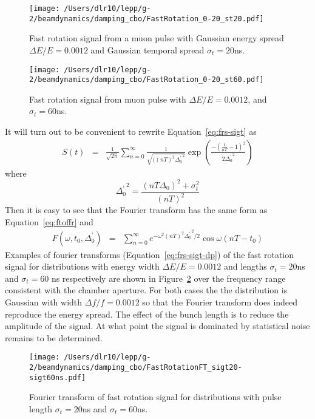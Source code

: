 \documentclass[10pt]{report}
\begin{document}
\begin{figure}[htbp] %
\begin{minipage}[t]{0.48\textwidth}
   \centering
   \texttt{[image: /Users/dlr10/lepp/g-2/beamdynamics/damping\_cbo/FastRotation\_0-20\_st20.pdf]} 
   \caption{Fast rotation signal from a muon pulse with Gaussian energy spread $\Delta E/E=0.0012$ and 
Gaussian temporal spread $\sigma_t = 20$ns. \label{fig:fastrotation_sigt20ns}}
 \end{minipage}
\hfill
\begin{minipage}[t]{0.48\textwidth}
\centering
   \texttt{[image: /Users/dlr10/lepp/g-2/beamdynamics/damping\_cbo/FastRotation\_0-20\_st60.pdf]} 
\caption{Fast rotation signal from muon pulse with $\Delta E/E = 0.0012$, and $\sigma_t = 60$ns.
   \label{fig:fastrotation_sigt60ns}}
\end{minipage}
\end{figure}
It will turn out to be convenient to rewrite Equation~\ref{eq:frs-sigt} as
\begin{eqnarray}
S(t)&=& \frac{1}{\sqrt{2\pi}}\sum_{n=0}^\infty
\frac{1}{\sqrt{((nT)^2{\Delta^\prime_0}^2}}
\exp(\frac{-(\frac{t}{nT}-1)^2}{2{\Delta^\prime_0}^2})\label{eq:frs-sigt-dp}
\end{eqnarray}
where $${\Delta^\prime_0}^2 = \frac{(nT\Delta_0)^2+\sigma_t^2}{(nT)^2}$$
Then it is easy to see that the Fourier transform has the same form as Equation~\ref{eq:ftoffr} and
\begin{eqnarray*}
F(\omega,t_0,\Delta_0^\prime)&=& \sum_{n=0}^\infty e^{-\omega^2(nT)^2{\Delta_0^\prime}^2/2}\cos\omega(nT-t_0)
\end{eqnarray*}
Examples of fourier transforms (Equation~\ref{eq:frs-sigt-dp}) of the fast rotation signal for distributions with energy width $\Delta E/E=0.0012$ and
lengths $\sigma_t=20$ns and $\sigma_t=60$ ns respectively are shown in Figure~\ref{fig:ft-sigt20-60}
over the frequency range consistent with the chamber aperture. For both cases the the distribution is Gaussian with width $\Delta f/f = 0.0012$ so that the Fourier
transform does indeed reproduce the energy spread. The effect of the bunch length is to reduce the amplitude of the signal. At what point the signal is dominated by statistical noise remains to be determined. 
\begin{figure}[htbp]
\centering
\texttt{[image: /Users/dlr10/lepp/g-2/beamdynamics/damping\_cbo/FastRotationFT\_sigt20-sigt60ns.pdf]}
\caption{Fourier transform of fast rotation signal for distributions with pulse length $\sigma_t=20$ns and $\sigma_t=60$ns.
\label{fig:ft-sigt20-60}}
\end{figure}
\end{document}
